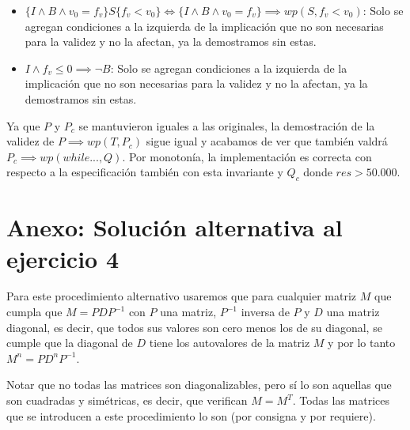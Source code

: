 \documentclass[10pt,a4paper]{article}
\begin{document}
\begin{itemize}
	Entonces, si sumamos todos los habitantes de la lista $ciudades$, este n\'umero mayor a 50.000 ser\'a sumado. 
	La \'unica forma de que la sumatoria total no sea mayor a 50.000 ser\'ia si existiera alg\'un n\'umero negativo entre los que se suman.
	Sabemos que esto no sucede gracias a otra condici\'on de $P$: 
	\begin{equation}
		\paraTodo[unalinea]{i}{\ent}{0 \le i < |ciudades| \implicaLuego ciudades[i].habitantes \ge 0}
	\end{equation}
	Por lo tanto, $(res = \sum\nolimits_{j=0}^{|ciudades| - 1} ciudades[j].habitantes \land P) \implies res > 50.000$
	\item $\{I \land B \land v_{0} = f_{v}\}S\{f_{v} < v_{0}\} \iff \{I \land B \land v_{0} = f_{v}\} \implies wp(S, f_{v} < v_{0})$: Solo se agregan condiciones a la izquierda de la implicación 
	que no son necesarias para la validez y no la afectan, ya la demostramos sin estas. 
	\item $I \land f_{v} \le 0 \implies \neg B$: Solo se agregan condiciones a la izquierda de la implicación 
	que no son necesarias para la validez y no la afectan, ya la demostramos sin estas. 
\end{itemize}

Ya que $P$ y $P_{c}$ se mantuvieron iguales a las originales, la demostración de la validez de $P \implies wp(T, P_{c})$ sigue igual y acabamos de ver que también valdrá $P_{c} \implies wp(while..., Q)$. 
Por monotonía, la implementación es correcta con respecto a la especificación también con esta invariante y $Q_{c}$ donde $res > 50.000$.
	
\section{Anexo: Solución alternativa al ejercicio 4}
	Para este procedimiento alternativo usaremos que para cualquier matriz $M$ que cumpla que $M = PDP^{-1}$ con $P$ una matriz,
	$P^{-1}$ inversa de $P$ y $D$ una matriz diagonal, es decir, que todos sus valores son cero menos los de su diagonal, se cumple que la diagonal
	de $D$ tiene los autovalores de la matriz $M$ y por lo tanto $M^{n} = PD^{n}P^{-1}$.
	
	Notar que no todas las matrices son diagonalizables, pero sí lo son aquellas que son cuadradas y simétricas,
	es decir, que verifican $M = M^{T}$. Todas las matrices que se introducen a este procedimiento lo son (por consigna y por requiere).
	
\end{document}
